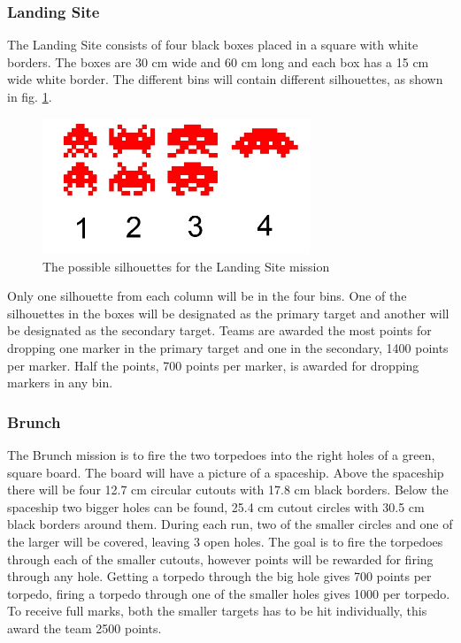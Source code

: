 		\subsubsection{Landing Site}
\noindent The Landing Site consists of four black boxes placed in a square with white borders. The boxes are 30 cm wide and 60 cm long and each box has a 15 cm wide white border. The different bins will contain different silhouettes, as shown in fig. \ref{landingsite_silhouettes}.  
\begin{figure}[!ht]
	\begin{center}
		\includegraphics[width=80mm]{./Images/Competition/landingsite_silhouettes.jpg}
		\caption{The possible silhouettes for the Landing Site mission}
		\label{landingsite_silhouettes}
	\end{center}
\end{figure}
Only one silhouette from each column will be in the four bins. One of the silhouettes in the boxes will be designated as the primary target and another will be designated as the secondary target. Teams are awarded the most points for dropping one marker in the primary target and one in the secondary, 1400 points per marker. Half the points, 700 points per marker, is awarded for dropping markers in any bin. 
		\subsubsection{Brunch}
\noindent The Brunch mission is to fire the two torpedoes into the right holes of a green, square board. The board will have a picture of a spaceship. Above the spaceship there will be four 12.7 cm circular cutouts with 17.8 cm black borders. Below the spaceship two bigger holes can be found, 25.4 cm cutout circles with 30.5 cm black borders around them. During each run, two of the smaller circles and one of the larger will be covered, leaving 3 open holes. The goal is to fire the torpedoes through each of the smaller cutouts, however points will be rewarded for firing through any hole. Getting a torpedo through the big hole gives 700 points per torpedo, firing a torpedo through one of the smaller holes gives 1000 per torpedo. To receive full marks, both the smaller targets has to be hit individually, this award the team 2500 points. 
